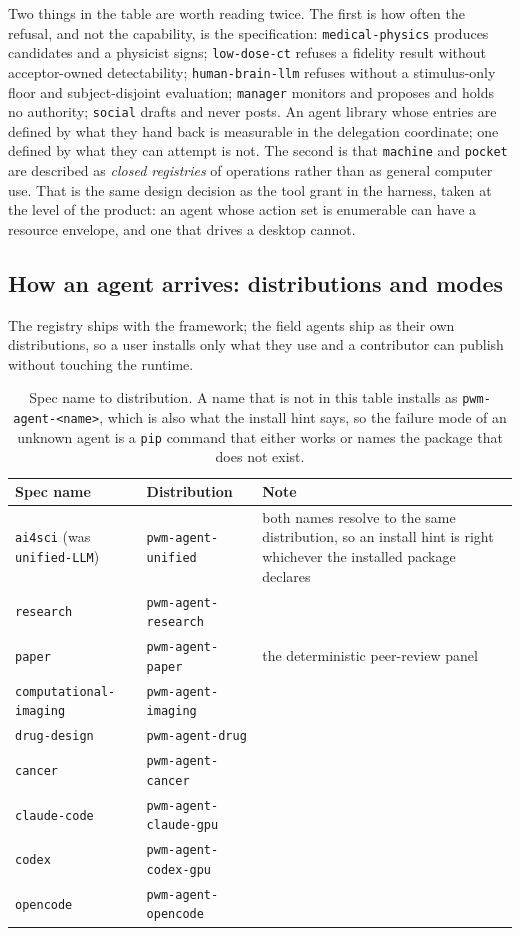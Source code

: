 Two things in the table are worth reading twice. The first is how often the refusal, and not the capability, is the specification: \texttt{medical-physics} produces candidates and a physicist signs; \texttt{low-dose-ct} refuses a fidelity result without acceptor-owned detectability; \texttt{human-brain-llm} refuses without a stimulus-only floor and subject-disjoint evaluation; \texttt{manager} monitors and proposes and holds no authority; \texttt{social} drafts and never posts. An agent library whose entries are defined by what they hand back is measurable in the delegation coordinate; one defined by what they can attempt is not. The second is that \texttt{machine} and \texttt{pocket} are described as \emph{closed registries} of operations rather than as general computer use. That is the same design decision as the tool grant in the harness, taken at the level of the product: an agent whose action set is enumerable can have a resource envelope, and one that drives a desktop cannot.

\subsection{How an agent arrives: distributions and modes}\label{sec:dists}

The registry ships with the framework; the field agents ship as their own distributions, so a user installs only what they use and a contributor can publish without touching the runtime.

\begin{table}[!htbp]
\centering\small
\begin{tabularx}{\textwidth}{@{}llY@{}}
\toprule
Spec name & Distribution & Note \\
\midrule
\texttt{ai4sci} (was \texttt{unified-LLM}) & \texttt{pwm-agent-unified} & both names resolve to the same distribution, so an install hint is right whichever the installed package declares \\
\texttt{research} & \texttt{pwm-agent-research} & \\
\texttt{paper} & \texttt{pwm-agent-paper} & the deterministic peer-review panel \\
\texttt{computational-\allowbreak imaging} & \texttt{pwm-agent-imaging} & \\
\texttt{drug-design} & \texttt{pwm-agent-drug} & \\
\texttt{cancer} & \texttt{pwm-agent-cancer} & \\
\texttt{claude-code} & \texttt{pwm-agent-claude-gpu} & \\
\texttt{codex} & \texttt{pwm-agent-codex-gpu} & \\
\texttt{opencode} & \texttt{pwm-agent-opencode} & \\
\bottomrule
\end{tabularx}
\caption{Spec name to distribution. A name that is not in this table installs as \texttt{pwm-agent-<name>}, which is also what the install hint says, so the failure mode of an unknown agent is a \texttt{pip} command that either works or names the package that does not exist.}
\label{tab:dists}
\end{table}

